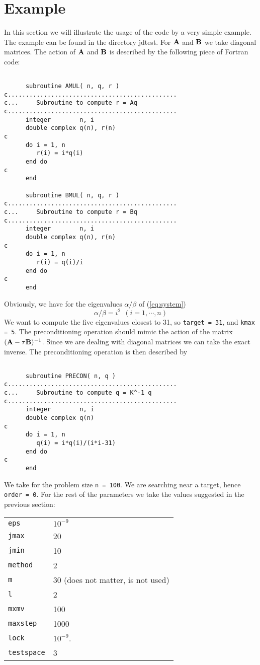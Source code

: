 \documentclass[12pt,a4paper]{article}
\def\BA{{\bf A}}\def\BB{{\bf B}}
\begin{document}
\section{Example}
In this section we will illustrate the usage of the code by a very simple
example. The example can be found in the directory jdtest. For $\BA$ and $\BB$ we
take diagonal matrices. The action of $\BA$ and $\BB$ is described by the 
following piece of Fortran code:
\begin{verbatim}

      subroutine AMUL( n, q, r )
c...............................................
c...     Subroutine to compute r = Aq
c...............................................
      integer        n, i
      double complex q(n), r(n)
c
      do i = 1, n
         r(i) = i*q(i)
      end do
c
      end

      subroutine BMUL( n, q, r )
c...............................................
c...     Subroutine to compute r = Bq
c...............................................
      integer        n, i
      double complex q(n), r(n)
c
      do i = 1, n
         r(i) = q(i)/i
      end do
c
      end

\end{verbatim}
Obviously, we have for the eigenvalues $\alpha / \beta$ of (\ref{eq:system})
\begin{equation}
   \alpha / \beta = i^2  ~~( i = 1, \cdots, n ) 
\end{equation}
We want to compute the five eigenvalues closest to 31, so {\tt target = 31}, 
and {\tt kmax = 5}. The preconditioning operation should mimic the action of
the matrix $(\BA - \tau \BB)^{-1}$. Since we are dealing with diagonal matrices 
we can take the exact inverse. The preconditioning operation is then 
described by
\begin{verbatim}

      subroutine PRECON( n, q )
c...............................................
c...     Subroutine to compute q = K^-1 q
c...............................................
      integer        n, i
      double complex q(n)
c
      do i = 1, n
         q(i) = i*q(i)/(i*i-31)
      end do
c
      end

\end{verbatim}
We take for the problem size {\tt n = 100}. We are searching near a target, hence {\tt order = 0}.
For the rest of the parameters we take the values suggested in the previous section:

\begin{tabular}{lp{10cm}}
{\tt eps}& $10^{-9}$\\
{\tt jmax}& 20\\
{\tt jmin}& 10\\
{\tt method}& 2\\
{\tt m}& 30 (does not matter, is not used)\\
{\tt l}& 2\\
{\tt mxmv}& 100\\
{\tt maxstep}& 1000\\
{\tt lock}& $10^{-9}$.\\
{\tt testspace}& 3
\end{tabular}
\end{document}

